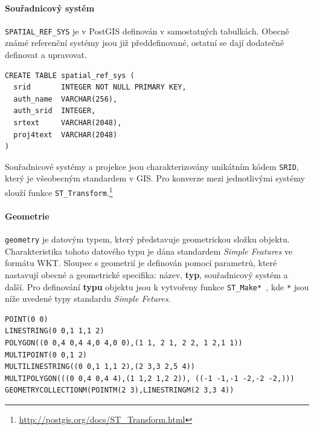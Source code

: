 \documentclass[a4paper,12pt]{report}
\begin{document}
\paragraph*{Souřadnicový systém} \texttt{SPATIAL\_REF\_SYS} je v PostGIS  definován v samostatných tabulkách. Obecně známé referenční systémy jsou již předdefinované, ostatní se dají dodatečně definovat a upravovat.

\begin{verbatim}
CREATE TABLE spatial_ref_sys (
  srid       INTEGER NOT NULL PRIMARY KEY,
  auth_name  VARCHAR(256),
  auth_srid  INTEGER,
  srtext     VARCHAR(2048),
  proj4text  VARCHAR(2048)
)
\end{verbatim}

Souřadnicové systémy a projekce jsou charakterizovány unikátním kódem \texttt{\acs{SRID}}, který je všeobecným standardem v GIS. Pro konverze mezi jednotlivými systémy slouží funkce \texttt{ST\_Transform}.\footnote{\url{http://postgis.org/docs/ST_Transform.html}}


\paragraph*{Geometrie} \texttt{geometry} je datovým typem, který představuje geometrickou složku objektu.  Charakteristika tohoto datového typu je dána standardem \textit{Simple Features} ve formátu \acs{WKT}.
Sloupec s geometrií je definován pomocí parametrů, které nastavují obecné a geometrické  specifika: název, \textbf{typ}, souřadnicový systém a další.
Pro definování \textbf{typu} objektu jsou k vytvořeny funkce \texttt{ST\_Make* }, kde \texttt{*} jsou níže uvedené typy standardu \textit{Simple Fetures}. 


\begin{verbatim}
POINT(0 0)                                               
LINESTRING(0 0,1 1,1 2)                                       
POLYGON((0 0,4 0,4 4,0 4,0 0),(1 1, 2 1, 2 2, 1 2,1 1))          
MULTIPOINT(0 0,1 2)                                              
MULTILINESTRING((0 0,1 1,1 2),(2 3,3 2,5 4))                       
MULTIPOLYGON(((0 0,4 0,4 4),(1 1,2 1,2 2)), ((-1 -1,-1 -2,-2 -2,))) 
GEOMETRYCOLLECTIONM(POINTM(2 3),LINESTRINGM(2 3,3 4))                
\end{verbatim}
\end{document}
